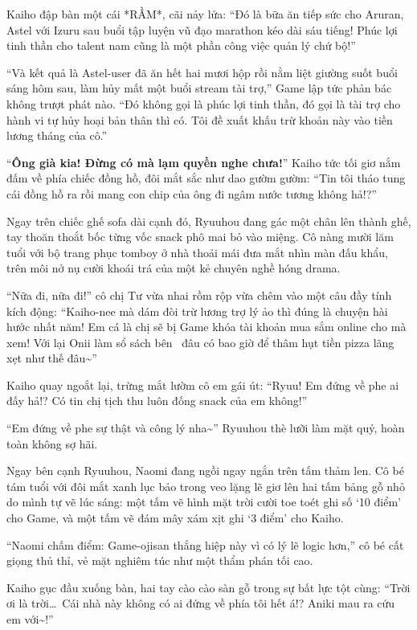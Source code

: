 ﻿\documentclass[../main.tex]{subfiles}
\begin{document}
Kaiho đập bàn một cái *RẦM*, cãi nảy lửa: ``Đó là bữa ăn tiếp sức cho Aruran, Astel với Izuru sau buổi tập luyện vũ đạo marathon kéo dài sáu tiếng! Phúc lợi tinh thần cho talent nam cũng là một phần công việc quản lý chứ bộ!''

``Và kết quả là Astel-user đã ăn hết hai mươi hộp rồi nằm liệt giường suốt buổi sáng hôm sau, làm hủy mất một buổi stream tài trợ,'' Game lập tức phản bác không trượt phát nào. ``Đó không gọi là phúc lợi tinh thần, đó gọi là tài trợ cho hành vi tự hủy hoại bản thân thì có. Tôi đề xuất khấu trừ khoản này vào tiền lương tháng của cô.''

``\textbf{Ông già kia! Đừng có mà lạm quyền nghe chưa!}'' Kaiho tức tối giơ nắm đấm về phía chiếc đồng hồ, đôi mắt sắc như dao gườm gườm: ``Tin tôi tháo tung cái đồng hồ ra rồi mang con chip của ông đi ngâm nước tương không hả!?''

Ngay trên chiếc ghế sofa dài cạnh đó, Ryuuhou đang gác một chân lên thành ghế, tay thoăn thoắt bốc từng vốc snack phô mai bỏ vào miệng. Cô nàng mười lăm tuổi với bộ trang phục tomboy ở nhà thoải mái đưa mắt nhìn màn đấu khẩu, trên môi nở nụ cười khoái trá của một kẻ chuyên nghề hóng drama.

``Nữa đi, nữa đi!'' cô chị Tư vừa nhai rồm rộp vừa chêm vào một câu đầy tính kích động: ``Kaiho-nee mà dám đòi trừ lương trợ lý ảo thì đúng là chuyện hài hước nhất năm! Em cá là chị sẽ bị Game khóa tài khoản mua sắm online cho mà xem! Với lại Onii làm sổ sách bên \hll\ đâu có bao giờ để thâm hụt tiền pizza lãng xẹt như thế đâu\~{}''

Kaiho quay ngoắt lại, trừng mắt lườm cô em gái út: ``Ryuu! Em đứng về phe ai đấy hả!? Có tin chị tịch thu luôn đống snack của em không!''

``Em đứng về phe sự thật và công lý nha\~{}'' Ryuuhou thè lưỡi làm mặt quỷ, hoàn toàn không sợ hãi.

Ngay bên cạnh Ryuuhou, Naomi đang ngồi ngay ngắn trên tấm thảm len. Cô bé tám tuổi với đôi mắt xanh lục bảo trong veo lặng lẽ giơ lên hai tấm bảng gỗ nhỏ do mình tự vẽ lúc sáng: một tấm vẽ hình mặt trời cười toe toét ghi số `10 điểm' cho Game, và một tấm vẽ đám mây xám xịt ghi `3 điểm' cho Kaiho.

``Naomi chấm điểm: Game-ojisan thắng hiệp này vì có lý lẽ logic hơn,'' cô bé cất giọng thủ thỉ, vẻ mặt nghiêm túc như một thẩm phán tối cao.

Kaiho gục đầu xuống bàn, hai tay cào cào sàn gỗ trong sự bất lực tột cùng: ``Trời ơi là trời\dots\ Cái nhà này không có ai đứng về phía tôi hết á!? Aniki mau ra cứu em với\~{}!''
\end{document}
